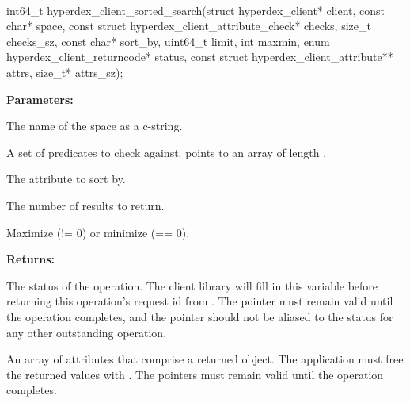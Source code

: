 \paragraph{}
\label{api:c:sorted_search}
\begin{ccode}
int64_t hyperdex_client_sorted_search(struct hyperdex_client* client,
                const char* space,
                const struct hyperdex_client_attribute_check* checks, size_t checks_sz,
                const char* sort_by,
                uint64_t limit,
                int maxmin,
                enum hyperdex_client_returncode* status,
                const struct hyperdex_client_attribute** attrs, size_t* attrs_sz);
\end{ccode}
\funcdesc 

\noindent\textbf{Parameters:}
\begin{description}[labelindent=\widthof{{\code{checks}, \code{checks\_sz}}},leftmargin=*,noitemsep,nolistsep,align=right]
\item[\code{space}] The name of the space as a c-string.
\item[\code{checks}, \code{checks\_sz}] A set of predicates to check against.   points to an array of length .
\item[\code{sort\_by}] The attribute to sort by.
\item[\code{limit}] The number of results to return.
\item[\code{maxmin}] Maximize (!= 0) or minimize (== 0).
\end{description}

\noindent\textbf{Returns:}
\begin{description}[labelindent=\widthof{{\code{attrs}, \code{attrs\_sz}}},leftmargin=*,noitemsep,nolistsep,align=right]
\item[\code{status}] The status of the operation.  The client library will fill in this variable before returning this operation's request id from .  The pointer must remain valid until the operation completes, and the pointer should not be aliased to the status for any other outstanding operation.
\item[\code{attrs}, \code{attrs\_sz}] An array of attributes that comprise a returned object.  The application must free the returned values with .  The pointers must remain valid until the operation completes.
\end{description}

